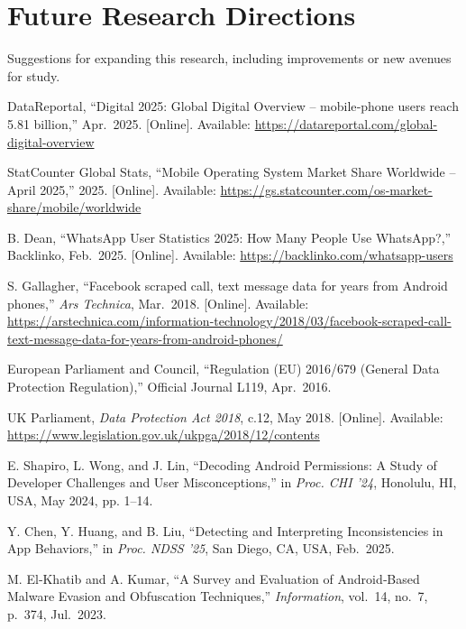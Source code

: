 \documentclass[a4paper,12pt]{report}
\begin{document}
\section{Future Research Directions}
Suggestions for expanding this research, including improvements or new avenues for study.

\begin{thebibliography}{99}
DataReportal, “Digital 2025: Global Digital Overview – mobile‐phone users reach 5.81 billion,” Apr.\ 2025.  [Online]. Available: \url{https://datareportal.com/global-digital-overview}

StatCounter Global Stats, “Mobile Operating System Market Share Worldwide – April 2025,” 2025. [Online]. Available: \url{https://gs.statcounter.com/os-market-share/mobile/worldwide}

B. Dean, “WhatsApp User Statistics 2025: How Many People Use WhatsApp?,” Backlinko, Feb.\ 2025.  [Online]. Available: \url{https://backlinko.com/whatsapp-users}

S. Gallagher, “Facebook scraped call, text message data for years from Android phones,” \emph{Ars Technica}, Mar.\ 2018.  [Online]. Available: \url{https://arstechnica.com/information-technology/2018/03/facebook-scraped-call-text-message-data-for-years-from-android-phones/}

European Parliament and Council, “Regulation (EU) 2016/679 (General Data Protection Regulation),” Official Journal L119, Apr.\ 2016.

UK Parliament, \emph{Data Protection Act 2018}, c.12, May 2018.  [Online]. Available: \url{https://www.legislation.gov.uk/ukpga/2018/12/contents}

E. Shapiro, L. Wong, and J. Lin, “Decoding Android Permissions: A Study of Developer Challenges and User Misconceptions,” in \emph{Proc. CHI ’24}, Honolulu, HI, USA, May 2024, pp. 1–14.

Y. Chen, Y. Huang, and B. Liu, “Detecting and Interpreting Inconsistencies in App Behaviors,” in \emph{Proc. NDSS ’25}, San Diego, CA, USA, Feb.\ 2025.

M. El‐Khatib and A. Kumar, “A Survey and Evaluation of Android‐Based Malware Evasion and Obfuscation Techniques,” \emph{Information}, vol.\ 14, no.\ 7, p.~374, Jul.\ 2023.


\end{thebibliography}
\end{document}
